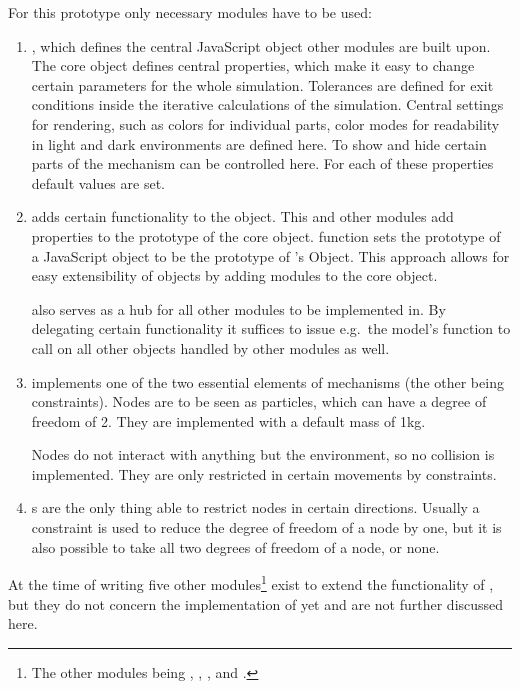For this prototype only necessary modules have to be used:
\begin{enumerate}
    \item {}, which defines the central JavaScript object other modules are built upon.
    The core  object defines central properties, which make it easy to change certain parameters for the whole simulation.
    Tolerances are defined for exit conditions inside the iterative calculations of the simulation.
    Central settings for rendering, such as colors for individual parts, color modes for readability in light and dark environments are defined here.
    To show and hide certain parts of the mechanism can be controlled here.
    For each of these properties default values are set.

    \item {} adds certain functionality to the  object. 
    This and other  modules add properties to the prototype of the  core object.
      function sets the prototype of a JavaScript object to be the prototype of 's  Object.
    This approach allows for easy extensibility of objects by adding modules to the core object.

     also serves as a hub for all other modules to be implemented in.
    By delegating certain functionality it suffices to issue e.g.\ the model's  function to call  on all other objects handled by other modules as well.
    
    \item {} implements one of the two essential elements of mechanisms (the other being constraints). Nodes are to be seen as particles, which can have a degree of freedom of 2. They are implemented with a default mass of 1kg.
    
    Nodes do not interact with anything but the environment, so no collision is implemented.
    They are only restricted in certain movements by constraints.

    \item {}s are the only thing able to restrict nodes in certain directions.
    Usually a constraint is used to reduce the degree of freedom of a node by one, but it is also possible to take all two degrees of freedom of a node, or none.
\end{enumerate}

At the time of writing five other modules\footnote{The other modules being , , ,  and .} exist to extend the functionality of , but they do not concern the implementation of  yet and are not further discussed here.

